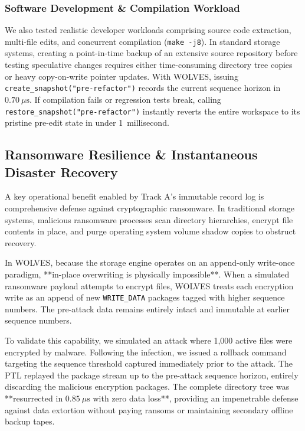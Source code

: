 \documentclass[conference]{IEEEtran}
\begin{document}
\subsubsection{Software Development \& Compilation Workload}
We also tested realistic developer workloads comprising source code extraction, multi-file edits, and concurrent compilation (\texttt{make -j8}). In standard storage systems, creating a point-in-time backup of an extensive source repository before testing speculative changes requires either time-consuming directory tree copies or heavy copy-on-write pointer updates. With WOLVES, issuing \texttt{create\_snapshot("pre-refactor")} records the current sequence horizon in $0.70~\mu\text{s}$. If compilation fails or regression tests break, calling \texttt{restore\_snapshot("pre-refactor")} instantly reverts the entire workspace to its pristine pre-edit state in under 1~millisecond.

\subsection{Ransomware Resilience \& Instantaneous Disaster Recovery}
A key operational benefit enabled by Track A's immutable record log is comprehensive defense against cryptographic ransomware. In traditional storage systems, malicious ransomware processes scan directory hierarchies, encrypt file contents in place, and purge operating system volume shadow copies to obstruct recovery. 

In WOLVES, because the storage engine operates on an append-only write-once paradigm, **in-place overwriting is physically impossible**. When a simulated ransomware payload attempts to encrypt files, WOLVES treats each encryption write as an append of new \texttt{WRITE\_DATA} packages tagged with higher sequence numbers. The pre-attack data remains entirely intact and immutable at earlier sequence numbers.

To validate this capability, we simulated an attack where 1,000 active files were encrypted by malware. Following the infection, we issued a rollback command targeting the sequence threshold captured immediately prior to the attack. The PTL replayed the package stream up to the pre-attack sequence horizon, entirely discarding the malicious encryption packages. The complete directory tree was **resurrected in $0.85~\mu\text{s}$ with zero data loss**, providing an impenetrable defense against data extortion without paying ransoms or maintaining secondary offline backup tapes.
\end{document}
